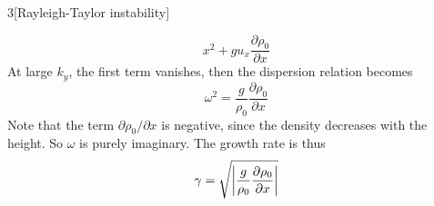 \documentclass[12pt]{article}
\begin{document}
\begin{problem}{3}[Rayleigh-Taylor instability]
\begin{solution}
\begin{equation}
{    x^2}+gu_x\frac{\partial\rho_0}{\partial x} 
\end{equation}
At large $k_y$, the first term vanishes, then the dispersion relation becomes
\begin{equation}
    \omega^2=\frac{g}{\rho_0}\frac{\partial\rho_0}{\partial x} 
\end{equation}
Note that the term $\partial\rho_0 /\partial x$ is negative, since the density
decreases with the height. So $\omega$ is purely imaginary. The growth rate is
thus
\begin{equation}
    \gamma=\sqrt{\abs{\frac{g}{\rho_0}\frac{\partial\rho_0}{\partial x}}}
\end{equation}
\end{solution}
\end{problem}
\end{document}
